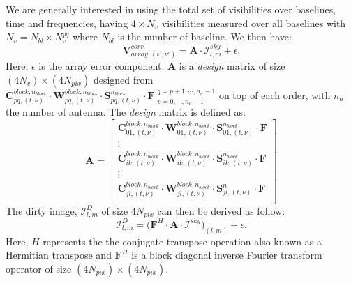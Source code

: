 \documentclass[useAMS,usenatbib]{mn2e}
\begin{document}
We are generally interested in using the total set of visibilities over baselines, time and frequencies, having $4\times N_v$ visibilities 
measured over all baselines with $N_v=N_{bl}\times N_v^{pq}$ where $N_{bl}$ is the number of baseline. We then have:\\
\begin{equation}
 \mathbf{V}_{array,(t',\nu')}^{corr}=\mathbf{A}\cdot\mathcal{I}_{l,m}^{sky} + \epsilon. \label{eq:vall}
\end{equation}
 Here, $\epsilon$ is the array error component. $\mathbf{A}$ is a \textit{design} matrix of size 
$(4N_v)\times (4N_{pix})$ designed from $\mathbf{C}_{pq,(t,\nu)}^{block,n_{block}}\cdot \mathbf{W}_{pq,(t,\nu)}^{block,n_{block}}\cdot 
\mathbf{S}_{pq,(t,\nu)}^{n_{block}}\cdot\mathbf{F}\Big|_{p=0,\cdots,n_{a}-1}^{q=p+1,\cdots,n_{a}-1}$ on top of each order, with $n_a$ the 
number of antenna. The \textit{design} matrix is defined as:
\begin{equation*}
\mathbf{A}_{}=
  \begin{bmatrix}
    \mathbf{C}_{01,(t,\nu)}^{block,n_{block}}\cdot \mathbf{W}_{01,(t,\nu)}^{block,n_{block}}\cdot \mathbf{S}_{01,(t,\nu)}^{n_{block}} 
\cdot\mathbf{F}\\
    \vdots\\
    \mathbf{C}_{ik,(t,\nu)}^{block,n_{block}}\cdot \mathbf{W}_{ik,(t,\nu)}^{block,n_{block}}\cdot \mathbf{S}_{ik,(t,\nu)}^{n_{block}} 
\cdot\mathbf{F}\\
    \vdots \\
    \mathbf{C}_{jl,(t,\nu)}^{block,n_{block}}\cdot \mathbf{W}_{jl,(t,\nu)}^{block,n_{block}}\cdot \mathbf{S}_{jl,(t,\nu)}^{n} 
\cdot\mathbf{F}\\
  \end{bmatrix}
\end{equation*}
The dirty image, $\mathcal{I}_{l,m}^{D}$ of size $4N_{pix}$ can then be derived as follow:
\begin{equation}
\mathcal{I}_{l,m}^{D}=\bigg(\mathbf{F}^{H}\cdot\mathbf{A}\cdot\mathcal{I}^{sky}\bigg)_{(l,m)} + \epsilon.
\end{equation}
Here, $H$ represents the the conjugate transpose operation also known as a Hermitian transpose and $\mathbf{F}^{H}$ is a block diagonal
inverse Fourier transform operator of size $(4N_{pix})\times(4N_{pix})$.
\end{document}
